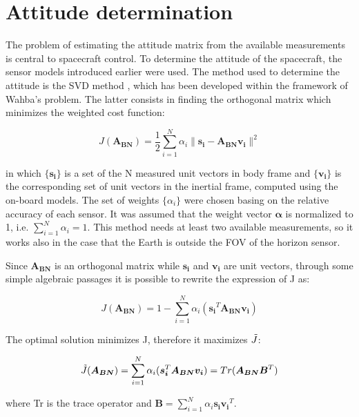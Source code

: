 \section{Attitude determination}
\label{subsec:attitude_det}

The problem of estimating the attitude matrix from the available measurements is central to spacecraft control. To determine the attitude of the spacecraft, the sensor models introduced earlier were used. The method used to determine the attitude is the SVD method \cite{crass_book}, which has been developed within the framework of Wahba's problem. The latter consists in finding the orthogonal matrix which minimizes the weighted cost function:

\begin{equation}
    J(\boldsymbol{A_{BN}})=\frac{1}{2}\sum_{i=1}^N\alpha_i\lVert \boldsymbol{s_i} - \boldsymbol{A_{BN}v_i} \rVert^2
\end{equation}

in which $\{\boldsymbol{s_i}\}$ is a set of the N measured unit vectors in body frame and $\{\boldsymbol{v_i}\}$ is the corresponding set of unit vectors in the inertial frame, computed using the on-board models. The set of weights $\{\alpha_i\}$ were chosen basing on the relative accuracy of each sensor. It was assumed that the weight vector $\boldsymbol{\alpha}$ is normalized to 1, i.e. $\sum_{i=1}^N\alpha_i=1$. This method needs at least two available measurements, so it works also in the case that the Earth is outside the FOV of the horizon sensor.

Since $\boldsymbol{A_{BN}}$ is an orthogonal matrix while $\boldsymbol{s_i}$ and $\boldsymbol{v_i}$ are unit vectors, through some simple algebraic passages it is possible to rewrite the expression of J as:

\begin{equation}
    J(\boldsymbol{A_{BN}})=1-\sum_{i=1}^N\alpha_i(\boldsymbol{s_i}^T\boldsymbol{A_{BN}}\boldsymbol{v_i})
\end{equation}

The optimal solution minimizes J, therefore it maximizes $\Tilde{J}$:

\begin{equation}
    \Tilde{J}(\boldsymbol{A_{BN}})=\sum_{i=1}^N\alpha_i(\boldsymbol{s_i}^T\boldsymbol{A_{BN}}\boldsymbol{v_i})=Tr(\boldsymbol{A_{BN}}\boldsymbol{B}^T)
\end{equation}

where Tr is the trace operator and $\boldsymbol{B}=\sum_{i=1}^N\alpha_i\boldsymbol{s_iv_i}^T$.

